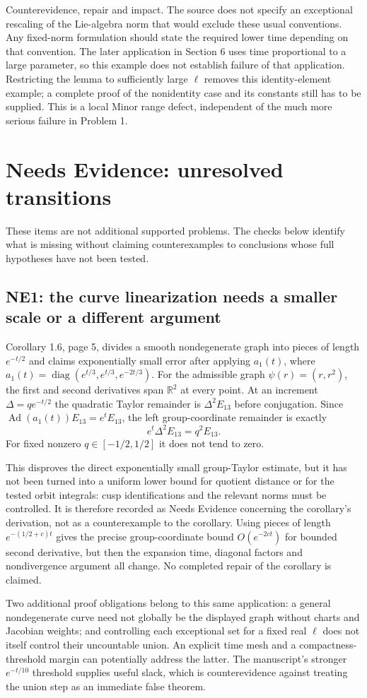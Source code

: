 \documentclass[10pt]{article}
\begin{document}
Counterevidence, repair and impact. The source does not specify an exceptional rescaling of the Lie-algebra norm that would exclude these usual conventions. Any fixed-norm formulation should state the required lower time depending on that convention. The later application in Section 6 uses time proportional to a large parameter, so this example does not establish failure of that application. Restricting the lemma to sufficiently large \(\ell\) removes this identity-element example; a complete proof of the nonidentity case and its constants still has to be supplied. This is a local Minor range defect, independent of the much more serious failure in Problem 1.\par
\section*{Needs Evidence: unresolved transitions}
These items are not additional supported problems. The checks below identify what is missing without claiming counterexamples to conclusions whose full hypotheses have not been tested.\par
\subsection*{NE1: the curve linearization needs a smaller scale or a different argument}
Corollary 1.6, page 5, divides a smooth nondegenerate graph into pieces of length \(e^{-t/2}\) and claims exponentially small error after applying \(a_1(t)\), where \(a_1(t)=\operatorname{diag}(e^{t/3},e^{t/3},e^{-2t/3})\). For the admissible graph \(\psi(r)=(r,r^2)\), the first and second derivatives span \(\mathbb R^2\) at every point. At an increment \(\Delta=q e^{-t/2}\) the quadratic Taylor remainder is \(\Delta^2E_{13}\) before conjugation. Since \(\operatorname{Ad}(a_1(t))E_{13}=e^tE_{13}\), the left group-coordinate remainder is exactly \[e^t\Delta^2E_{13}=q^2E_{13}.\] For fixed nonzero \(q\in[-1/2,1/2]\) it does not tend to zero.\par
This disproves the direct exponentially small group-Taylor estimate, but it has not been turned into a uniform lower bound for quotient distance or for the tested orbit integrals: cusp identifications and the relevant norms must be controlled. It is therefore recorded as Needs Evidence concerning the corollary’s derivation, not as a counterexample to the corollary. Using pieces of length \(e^{-(1/2+c)t}\) gives the precise group-coordinate bound \(O(e^{-2ct})\) for bounded second derivative, but then the expansion time, diagonal factors and nondivergence argument all change. No completed repair of the corollary is claimed.\par
Two additional proof obligations belong to this same application: a general nondegenerate curve need not globally be the displayed graph without charts and Jacobian weights; and controlling each exceptional set for a fixed real \(\ell\) does not itself control their uncountable union. An explicit time mesh and a compactness-threshold margin can potentially address the latter. The manuscript’s stronger \(e^{-t/10}\) threshold supplies useful slack, which is counterevidence against treating the union step as an immediate false theorem.\par
\end{document}

